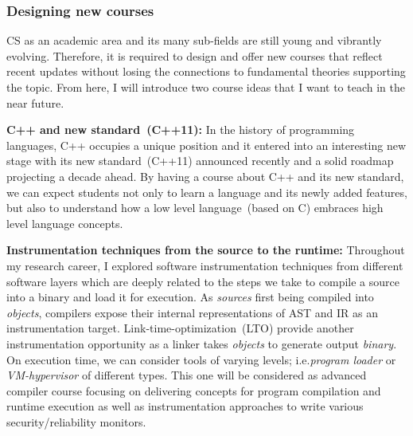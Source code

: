 \documentclass[letterpaper, 10pt]{article}
\def\ie{i.e.\xspace}
\begin{document}
\begin{small}
\subsubsection*{Designing new courses} 

CS as an academic area and its many sub-fields are still young and vibrantly
evolving. Therefore, it is required to design and offer new courses that
reflect recent updates without losing the connections to fundamental theories
supporting the topic. From here, I will introduce two course ideas that I want
to teach in the near future. 

{\bf C++ and new standard~(C++11):} In the history of programming languages,
C++ occupies a unique position and it entered into an interesting new stage
with its new standard~(C++11) announced recently and a solid roadmap projecting
a decade ahead.
%
%
By having a course about C++ and its new standard, we can expect students not
only to learn a language and its newly added features, but also to understand
how a low level language~(based on C) embraces high level language concepts. 

{\bf Instrumentation techniques from the source to the runtime:} 
Throughout my research career, I explored software instrumentation techniques
from different software layers which are deeply related to the steps we take to
compile a source into a binary and load it for execution. 
%
As {\it sources} first being compiled into {\it objects}, compilers expose their 
internal representations of AST and IR as an instrumentation target.
%
Link-time-optimization~(LTO) provide another instrumentation opportunity as a
linker takes {\it objects} to generate output {\it binary}. 
%
On execution time, we can consider tools of varying levels; \ie {\it program
loader} or {\it VM-hypervisor} of different types.
%
This one will be considered as  advanced compiler course focusing on delivering
concepts for program compilation and runtime execution as well as
instrumentation approaches to write various security/reliability monitors.


\end{small}
\end{document}
